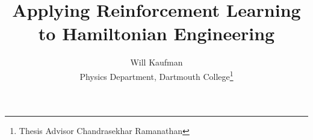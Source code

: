 \documentclass{report}
\title{Applying Reinforcement Learning to Hamiltonian Engineering}
\author{Will Kaufman \\ Physics Department, Dartmouth College\thanks{Thesis Advisor Chandrasekhar Ramanathan}}
\begin{document}
\maketitle

\begin{abstract}

\end{abstract}



\tableofcontents












\printbibliography



\end{document}
